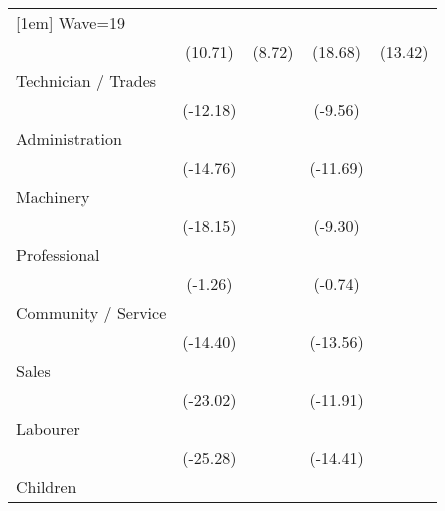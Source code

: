 {\begin{tabular}{l*{4}{c}}
[1em]
Wave=19             &            \sym{***}&            \sym{***}&            \sym{***}&            \sym{***}\\
                    &     (10.71)         &      (8.72)         &     (18.68)         &     (13.42)         \\
[1em]
Technician / Trades &            \sym{***}&                     &            \sym{***}&                     \\
                    &    (-12.18)         &                     &     (-9.56)         &                     \\
[1em]
Administration      &            \sym{***}&                     &            \sym{***}&                     \\
                    &    (-14.76)         &                     &    (-11.69)         &                     \\
[1em]
Machinery           &            \sym{***}&                     &            \sym{***}&                     \\
                    &    (-18.15)         &                     &     (-9.30)         &                     \\
[1em]
Professional        &                     &                     &                     &                     \\
                    &     (-1.26)         &                     &     (-0.74)         &                     \\
[1em]
Community / Service &            \sym{***}&                     &            \sym{***}&                     \\
                    &    (-14.40)         &                     &    (-13.56)         &                     \\
[1em]
Sales               &            \sym{***}&                     &            \sym{***}&                     \\
                    &    (-23.02)         &                     &    (-11.91)         &                     \\
[1em]
Labourer            &            \sym{***}&                     &            \sym{***}&                     \\
                    &    (-25.28)         &                     &    (-14.41)         &                     \\
[1em]
Children            &                     &            \sym{***}&                     &                     \\

\end{tabular}}
